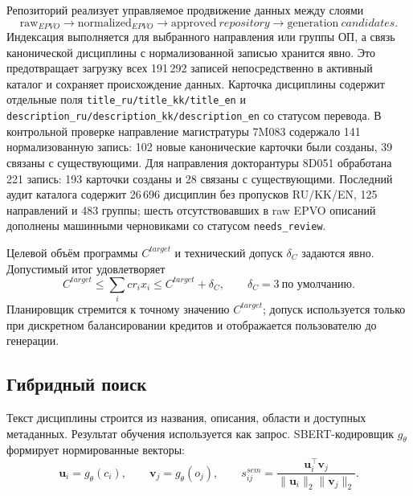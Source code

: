 \documentclass[twoside,11pt]{article}
\begin{document}
Репозиторий реализует управляемое продвижение данных между слоями
\begin{equation}
  \mathrm{raw}_{EPVO}
  \rightarrow
  \mathrm{normalized}_{EPVO}
  \rightarrow
  \mathrm{approved}\ repository
  \rightarrow
  \mathrm{generation}\ candidates.
  \label{eq:repository-layers}
\end{equation}
Индексация выполняется для выбранного направления или группы ОП, а связь канонической дисциплины с нормализованной записью хранится явно. Это предотвращает загрузку всех 191\,292 записей непосредственно в активный каталог и сохраняет происхождение данных. Карточка дисциплины содержит отдельные поля \texttt{title\_ru/title\_kk/title\_en} и \texttt{description\_ru/description\_kk/description\_en} со статусом перевода. В контрольной проверке направление магистратуры 7M083 содержало 141 нормализованную запись: 102 новые канонические карточки были созданы, 39 связаны с существующими. Для направления докторантуры 8D051 обработана 221 запись: 193 карточки созданы и 28 связаны с существующими. Последний аудит каталога содержит 26\,696 дисциплин без пропусков RU/KK/EN, 125 направлений и 483 группы; шесть отсутствовавших в raw EPVO описаний дополнены машинными черновиками со статусом \texttt{needs\_review}.

Целевой объём программы $C^{target}$ и технический допуск $\delta_C$ задаются явно. Допустимый итог удовлетворяет
\begin{equation}
  C^{target}\le \sum_i cr_i x_i \le C^{target}+\delta_C,
  \qquad \delta_C=3\ \text{по умолчанию}.
  \label{eq:credit-tolerance}
\end{equation}
Планировщик стремится к точному значению $C^{target}$; допуск используется только при дискретном балансировании кредитов и отображается пользователю до генерации.

\subsection{Гибридный поиск}

Текст дисциплины строится из названия, описания, области и доступных метаданных. Результат обучения используется как запрос. SBERT-кодировщик $g_\theta$ формирует нормированные векторы:
\begin{equation}
  \mathbf{u}_i=g_\theta(c_i),\qquad
  \mathbf{v}_j=g_\theta(o_j),\qquad
  s_{ij}^{sem}=
  \frac{\mathbf{u}_i^\top\mathbf{v}_j}
       {\|\mathbf{u}_i\|_2\|\mathbf{v}_j\|_2}.
  \label{eq:cosine}
\end{equation}
\end{document}
